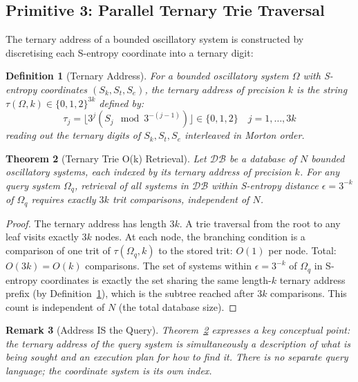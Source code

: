 \documentclass[10pt,twocolumn]{article}
\newtheorem{theorem}{Theorem}[section]
\newtheorem{definition}[theorem]{Definition}
\newtheorem{remark}[theorem]{Remark}
\begin{document}
\subsection{Primitive 3: Parallel Ternary Trie Traversal}

The ternary address of a bounded oscillatory system is constructed
by discretising each S-entropy coordinate into a ternary digit:

\begin{definition}[Ternary Address]
\label{def:ternary-address}
For a bounded oscillatory system $\Omega$ with S-entropy coordinates $(S_k, S_t, S_e)$,
the \emph{ternary address} of precision $k$ is the string
$\tau(\Omega, k) \in \{0,1,2\}^{3k}$ defined by:
\begin{equation}
\tau_j = \lfloor 3^j (S_j \mod 3^{-(j-1)}) \rfloor \in \{0,1,2\}
\quad j = 1, \ldots, 3k
\label{eq:ternary-addr}
\end{equation}
reading out the ternary digits of $S_k, S_t, S_e$ interleaved in Morton order.
\end{definition}

\begin{theorem}[Ternary Trie O(k) Retrieval]
\label{thm:trie-ok}
Let $\mathcal{DB}$ be a database of $N$ bounded oscillatory systems,
each indexed by its ternary address of precision $k$.
For any query system $\Omega_q$, retrieval of all systems in $\mathcal{DB}$
within S-entropy distance $\epsilon = 3^{-k}$ of $\Omega_q$ requires
exactly $3k$ trit comparisons, independent of $N$.
\end{theorem}

\begin{proof}
The ternary address has length $3k$.
A trie traversal from the root to any leaf visits exactly $3k$ nodes.
At each node, the branching condition is a comparison of one trit
of $\tau(\Omega_q, k)$ to the stored trit: $O(1)$ per node.
Total: $O(3k) = O(k)$ comparisons.
The set of systems within $\epsilon = 3^{-k}$ of $\Omega_q$ in
S-entropy coordinates is exactly the set sharing the same length-$k$
ternary address prefix (by Definition~\ref{def:ternary-address}),
which is the subtree reached after $3k$ comparisons.
This count is independent of $N$ (the total database size).
\end{proof}

\begin{remark}[Address IS the Query]
Theorem~\ref{thm:trie-ok} expresses a key conceptual point:
the ternary address of the query system is simultaneously
a description of what is being sought and an execution plan
for how to find it. There is no separate query language;
the coordinate system is its own index.
\end{remark}
\end{document}

